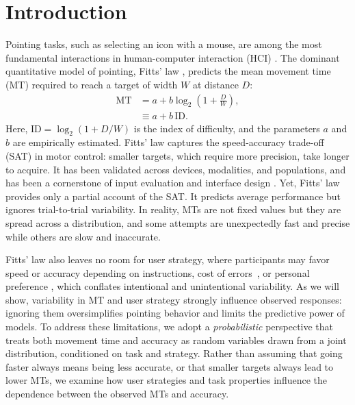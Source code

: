 \documentclass[acmlarge, manuscript,review]{acmart}
\newcommand{\mt}{\ensuremath{{\text{MT}}}\xspace}
\begin{document}
\section{Introduction\label{sec:introduction}}
Pointing tasks, such as selecting an icon with a mouse, are among the most fundamental interactions in human-computer interaction (HCI) \cite{card1978,soukoreff2004}. 
The dominant quantitative model of pointing, Fitts' law \cite{fitts1954,soukoreff2004,gori2018tochi}, predicts the mean movement time (MT) required to reach a target of width \(W\) at distance \(D\):
\begin{align}
	\mt & = a + b \log_2 (1 + \tfrac{D}{W}), \label{eq:fitts} \\
	          & \equiv a + b\,\text{ID}.
\end{align}
Here, $\text{ID}=\log_2 (1+D/W)$ is the index of difficulty, and the parameters $a$ and $b$ are empirically estimated. 
Fitts' law captures the speed-accuracy trade-off (SAT) in motor control: smaller targets, which require more precision, take longer to acquire. 
It has been validated across devices, modalities, and populations, and has been a cornerstone of input evaluation and interface design \cite{card1978,soukoreff2004}.
Yet, Fitts' law provides only a partial account of the SAT. It predicts average performance but ignores trial-to-trial variability. In reality, MTs are not fixed values but they are spread across a distribution, and some attempts are unexpectedly fast and precise while others are slow and inaccurate. 



Fitts' law also leaves no room for user strategy, where participants may favor speed or accuracy depending on instructions, cost of errors~\cite{bertucco2015}, or personal preference \cite{zhai2004nominal,guiard2015}, which conflates intentional and unintentional variability. As we will show, variability in MT and user strategy strongly influence observed responses: ignoring them oversimplifies pointing behavior and limits the predictive power of models.
To address these limitations, we adopt a \textit{probabilistic} perspective that treats both movement time and accuracy as random variables drawn from a joint distribution, conditioned on task and strategy.
Rather than assuming that going faster always means being less accurate, or that smaller targets always lead to lower MTs, we examine how user strategies and task properties influence the dependence between the observed MTs and accuracy.
\end{document}
